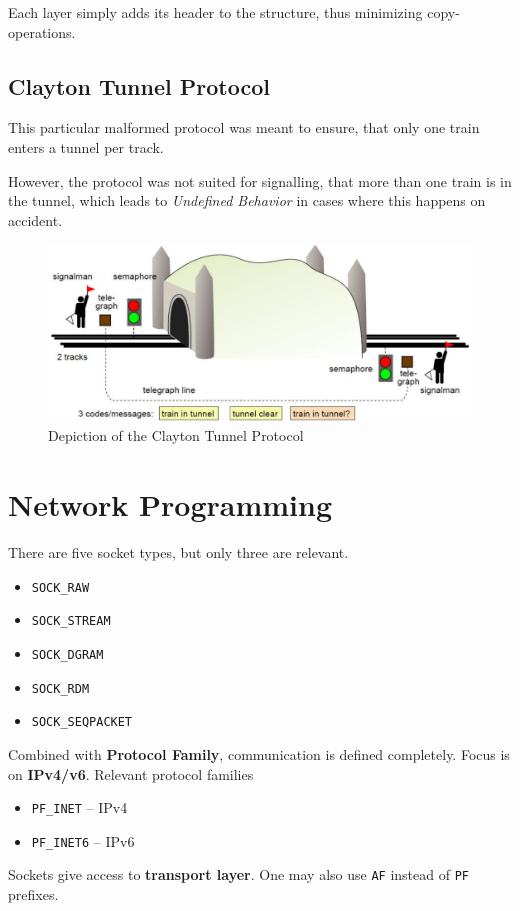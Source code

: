 \documentclass[english]{panikzettel}
\begin{document}
	Each layer simply adds its header to the structure, thus minimizing copy-operations.

	\subsection{Clayton Tunnel Protocol}
	\label{ss-clayton-tunnel-protocol}
	\begin{halfboxl}
		This particular malformed protocol was meant to ensure, that only one train enters a tunnel per track. 
		
		However, the protocol was not suited for signalling, that more than one train is in the tunnel, which leads to \textit{Undefined Behavior} in cases where this happens on accident.
	\end{halfboxl}
	\begin{halfboxr}
		\vspace{-\baselineskip}
		\begin{figure}[H]
			\centering
			\includegraphics[width=\textwidth]{img/0-clayton.png}
			\caption{Depiction of the Clayton Tunnel Protocol}
			\label{img-0-clayton}
		\end{figure}
	\end{halfboxr}
	
	\newpage
	\section{Network Programming}

	There are five socket types, but only three are relevant.
	\begin{itemize}
		\item \texttt{SOCK\_RAW}
		\item \texttt{SOCK\_STREAM}
		\item \texttt{SOCK\_DGRAM}
		\item \texttt{SOCK\_RDM}
		\item \texttt{SOCK\_SEQPACKET}
	\end{itemize}
	Combined with \textbf{Protocol Family}, communication is defined completely.
	Focus is on \textbf{IPv4/v6}.
	Relevant protocol families
	\begin{itemize}
		\item \texttt{PF\_INET} – IPv4
		\item \texttt{PF\_INET6} – IPv6
	\end{itemize}
	Sockets give access to \textbf{transport layer}.
	One may also use \texttt{AF} instead of \texttt{PF} prefixes.
	
\end{document}
